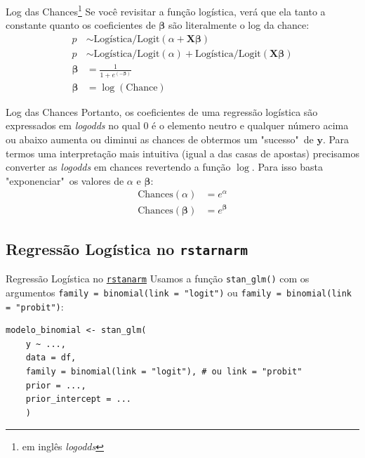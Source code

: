\begin{frame}{Log das Chances\footnote{em inglês \textit{logodds}}}
    Se você revisitar a função logística, verá que ela tanto a constante quanto
    os coeficientes de $\boldsymbol{\beta}$ são literalmente o log da
    chance:
    $$
    \begin{aligned}
        p &\sim \text{Logística/Logit}(\alpha +  \mathbf{X} \boldsymbol{\beta} ) \\
        p &\sim \text{Logística/Logit}(\alpha) + \text{Logística/Logit}( \mathbf{X} \boldsymbol{\beta}) \\
        \boldsymbol{\beta} &= \frac{1}{1 + e^{(-\boldsymbol{\beta})}}\\
        \boldsymbol{\beta} &= \log(\text{Chance})
    \end{aligned}
    $$
\end{frame}

\begin{frame}{Log das Chances}
    Portanto, os coeficientes de uma regressão logística são expressados em
    \textit{logodds} no qual $0$ é o elemento neutro e qualquer número acima ou
    abaixo aumenta ou diminui as chances de obtermos um "sucesso"~de
    $\boldsymbol{y}$. Para termos uma interpretação mais intuitiva
    (igual a das casas de apostas) precisamos converter as \textit{logodds}
    em chances revertendo a função $\log$. Para isso basta "exponenciar"~os
    valores de $\alpha$ e $\boldsymbol{\beta}$:
    $$
    \begin{aligned}
        \text{Chances}(\alpha) &= e^\alpha \\
        \text{Chances}({\boldsymbol{\beta}}) &= e^{\boldsymbol{\beta}}
    \end{aligned}
    $$
\end{frame}

\subsection{Regressão Logística no \texttt{rstarnarm}}
\begin{frame}[fragile]{Regressão Logística no \href{http://mc-stan.org/rstanarm/}{\texttt{rstanarm}}}
    Usamos a função \texttt{stan\_glm()} com os argumentos \texttt{family = binomial(link = "logit")} ou
    \texttt{family = binomial(link = "probit")}:
    \vfill
    \begin{lstlisting}[basicstyle=\small]
    modelo_binomial <- stan_glm(
    y ~ ...,
    data = df,
    family = binomial(link = "logit"), # ou link = "probit"
    prior = ...,
    prior_intercept = ...
    )
    \end{lstlisting}
\end{frame}

